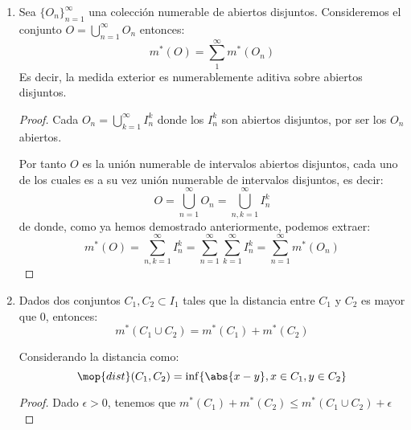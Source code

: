 \documentclass{apuntes}
\begin{document}
\begin{enumerate}
\begin{proof}
Tenemos que, lógicamente $O \cup I \smallsetminus O = I$

Por tanto
\[m^*(O)+m^*(I \smallsetminus O) = \abs{I}\]

Sabiendo que $I \smallsetminus K  \subset  \left( I \smallsetminus O \right) \cup \left( O \smallsetminus K \right)$, deducimos:
\[m^*\left(I \smallsetminus K\right) \leq m^*\left(I \smallsetminus O\right) + m^*\left(O \smallsetminus K\right)\]

Si usamos que $m^*\left(K\right) \leq m^*\left(O\right)$, a partir de la desigualdad anterior obtenemos:
\[m^*\left(K\right) + m^*\left(I \smallsetminus K\right) \leq m^*\left(O\right) + m^*\left(I \smallsetminus O\right) + m^*\left(O \smallsetminus K\right) \leq \abs{I} + \epsilon \forall \epsilon\]

\end{proof}

%
\item Sea $\lbrace O_n\rbrace_{n=1}^{\infty}$ una colección numerable de abiertos disjuntos. Consideremos el conjunto $O=\bigcup_{n=1}^{\infty}O_n$ entonces:
\[m^*(O)=\sum_1^{\infty}m^*(O_n)\]
Es decir, la medida exterior es numerablemente aditiva sobre abiertos disjuntos.

\begin{proof}
Cada $O_n=\bigcup_{k=1}^{\infty}I_n^k$ donde los $I_n^k$ son abiertos disjuntos, por ser los $O_n$ abiertos.

Por tanto $O$ es la unión numerable de intervalos abiertos disjuntos, cada uno de los cuales es a su vez unión numerable de intervalos disjuntos, es decir:
\[O= \bigcup_{n=1}^{\infty}O_n = \bigcup_{n,k=1}^{\infty} I_n^k\]
de donde, como ya hemos demostrado anteriormente, podemos extraer:
\[m^*(O)=\sum_{n,k=1}^{\infty}I_n^k = \sum_{n=1}^{\infty}\sum_{k=1}^{\infty}I_n^k=\sum_{n=1}^{\infty} m^*(O_n)\]
\end{proof}

%
\item Dados dos conjuntos $C_1, C_2 \subset I_1$  tales que la distancia entre $C_1$  y $C_2$ es mayor que 0, entonces:
\[m^*(C_1 \cup C_2) = m^*(C_1) + m^*(C_2)\]

Considerando la distancia como:
\[\mop{dist}(C_1, C_2) =  \inf\lbrace \abs{x-y}, x\in C_1, y\in C_2 \rbrace \]

\begin{proof}
Dado $\epsilon > 0$, tenemos que $m^*(C_1) + m^*(C_2) \leq m^*(C_1 \cup C_2) +  \epsilon$


\end{proof}
\end{enumerate}
\end{document}
